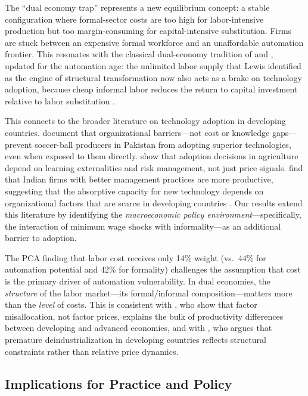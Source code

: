 \documentclass[5p,times,authoryear]{elsarticle}
\begin{document}
The ``dual economy trap'' represents a new equilibrium concept: a stable configuration where formal-sector costs are too high for labor-intensive production but too margin-consuming for capital-intensive substitution. Firms are stuck between an expensive formal workforce and an unaffordable automation frontier. This resonates with the classical dual-economy tradition of \citet{lewis1954economic} and \citet{harris1970migration}, updated for the automation age: the unlimited labor supply that Lewis identified as the engine of structural transformation now also acts as a brake on technology adoption, because cheap informal labor reduces the return to capital investment relative to labor substitution \citep{loayza2011informal}.

This connects to the broader literature on technology adoption in developing countries. \citet{atkin2017organizational} document that organizational barriers---not cost or knowledge gaps---prevent soccer-ball producers in Pakistan from adopting superior technologies, even when exposed to them directly. \citet{foster2010microeconomics} show that adoption decisions in agriculture depend on learning externalities and risk management, not just price signals. \citet{bloom2013management} find that Indian firms with better management practices are more productive, suggesting that the absorptive capacity for new technology depends on organizational factors that are scarce in developing countries \citep{cirera2017innovation}. Our results extend this literature by identifying the \emph{macroeconomic policy environment}---specifically, the interaction of minimum wage shocks with informality---as an additional barrier to adoption.

The PCA finding that labor cost receives only 14\% weight (vs.\ 44\% for automation potential and 42\% for formality) challenges the assumption that cost is the primary driver of automation vulnerability. In dual economies, the \emph{structure} of the labor market---its formal/informal composition---matters more than the \emph{level} of costs. This is consistent with \citet{hsieh2009misallocation}, who show that factor misallocation, not factor prices, explains the bulk of productivity differences between developing and advanced economies, and with \citet{rodrik2016premature}, who argues that premature deindustrialization in developing countries reflects structural constraints rather than relative price dynamics.

\subsection{Implications for Practice and Policy}
\label{subsec:practice_policy}
\end{document}
